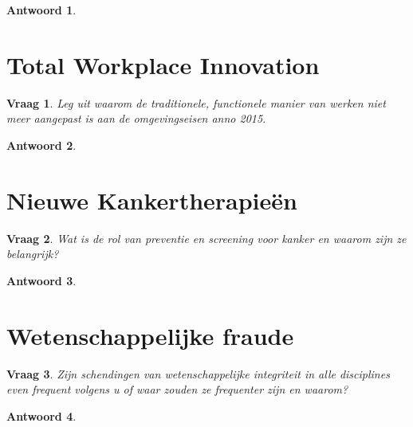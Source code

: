 \documentclass{article}
\theoremstyle{plain}
\newtheorem{question}{Vraag}
\theoremstyle{nonumberplain}
\newtheorem{answer}{Antwoord}
\begin{document}
\begin{answer}

\end{answer}

\section{Total Workplace Innovation}

\begin{question}
Leg uit waarom de traditionele, functionele manier van werken niet meer
aangepast is aan de omgevingseisen anno 2015.
\end{question}

\begin{answer}

\end{answer}

\section{Nieuwe Kankertherapieën}

\begin{question}
Wat is de rol van preventie en screening voor kanker en waarom zijn ze
belangrijk?
\end{question}

\begin{answer}

\end{answer}

\section{Wetenschappelijke fraude}

\begin{question}
Zijn schendingen van wetenschappelijke integriteit in alle disciplines even
frequent volgens u of waar zouden ze frequenter zijn en waarom?
\end{question}

\begin{answer}

\end{answer}
\end{document}
